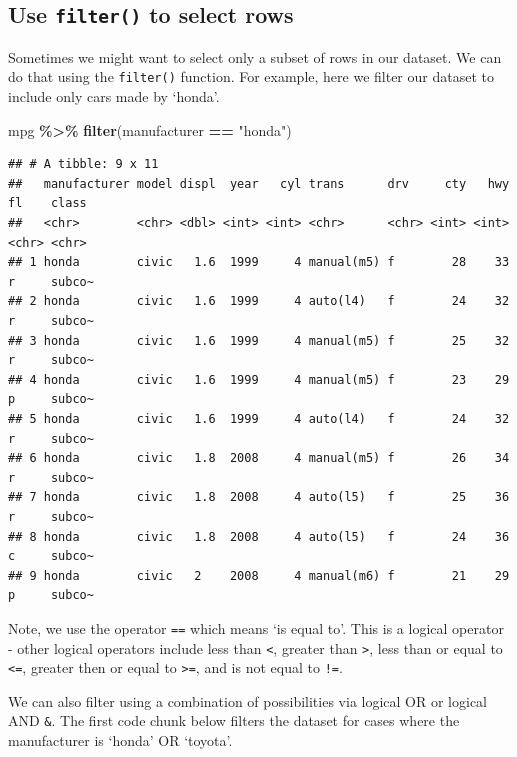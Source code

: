 \documentclass[
]{book}
\newenvironment{Shaded}{\begin{snugshade}}{\end{snugshade}}
\newcommand{\FunctionTok}[1]{\textcolor[rgb]{0.13,0.29,0.53}{\textbf{#1}}}
\newcommand{\NormalTok}[1]{#1}
\newcommand{\SpecialCharTok}[1]{\textcolor[rgb]{0.81,0.36,0.00}{\textbf{#1}}}
\newcommand{\StringTok}[1]{\textcolor[rgb]{0.31,0.60,0.02}{#1}}
\begin{document}
\hypertarget{use-filter-to-select-rows}{%
\subsection{\texorpdfstring{Use \texttt{filter()} to select rows}{Use filter() to select rows}}\label{use-filter-to-select-rows}}

Sometimes we might want to select only a subset of rows in our dataset. We can do that using the \texttt{filter()} function. For example, here we filter our dataset to include only cars made by `honda'.

\begin{Shaded}
\begin{Highlighting}[]
\NormalTok{mpg }\SpecialCharTok{\%\textgreater{}\%}
  \FunctionTok{filter}\NormalTok{(manufacturer }\SpecialCharTok{==} \StringTok{"honda"}\NormalTok{)}
\end{Highlighting}
\end{Shaded}

\begin{verbatim}
## # A tibble: 9 x 11
##   manufacturer model displ  year   cyl trans      drv     cty   hwy fl    class 
##   <chr>        <chr> <dbl> <int> <int> <chr>      <chr> <int> <int> <chr> <chr> 
## 1 honda        civic   1.6  1999     4 manual(m5) f        28    33 r     subco~
## 2 honda        civic   1.6  1999     4 auto(l4)   f        24    32 r     subco~
## 3 honda        civic   1.6  1999     4 manual(m5) f        25    32 r     subco~
## 4 honda        civic   1.6  1999     4 manual(m5) f        23    29 p     subco~
## 5 honda        civic   1.6  1999     4 auto(l4)   f        24    32 r     subco~
## 6 honda        civic   1.8  2008     4 manual(m5) f        26    34 r     subco~
## 7 honda        civic   1.8  2008     4 auto(l5)   f        25    36 r     subco~
## 8 honda        civic   1.8  2008     4 auto(l5)   f        24    36 c     subco~
## 9 honda        civic   2    2008     4 manual(m6) f        21    29 p     subco~
\end{verbatim}

Note, we use the operator \texttt{==} which means `is equal to'. This is a logical operator - other logical operators include less than \texttt{\textless{}}, greater than \texttt{\textgreater{}}, less than or equal to \texttt{\textless{}=}, greater then or equal to \texttt{\textgreater{}=}, and is not equal to \texttt{!=}.

We can also filter using a combination of possibilities via logical OR \texttt{\textbar{}} or logical AND \texttt{\&}. The first code chunk below filters the dataset for cases where the manufacturer is `honda' OR `toyota'.
\end{document}
